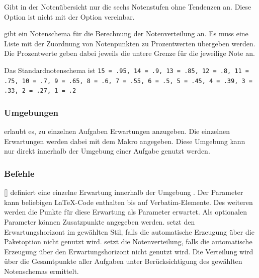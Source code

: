 \begin{options}
     Gibt in der Notenübersicht nur die sechs Notenstufen ohne Tendenzen an. Diese Option ist nicht mit der Option  vereinbar. 

     gibt ein Notenschema für die Berechnung der Notenverteilung an. Es muss eine Liste mit der Zuordnung von Notenpunkten zu Prozentwerten übergeben werden. Die Prozentwerte geben dabei jeweils die untere Grenze für die jeweilige Note an.

    Das Standardnotenschema ist \texttt{15 = .95, 14 = .9, 13 = .85, 12 = .8, 11 = .75, 10 = .7, 9 = .65, 8 = .6, 7 = .55, 6 = .5, 5 = .45, 4 = .39, 3 = .33, 2 = .27, 1 = .2}
\end{options}

\subsubsection{Umgebungen}
\begin{environments}
     erlaubt es, zu einzelnen Aufgaben Erwartungen anzugeben. Die einzelnen Erwartungen werden dabei mit dem Makro  angegeben. Diese Umgebung kann nur direkt innerhalb der Umgebung einer Aufgabe genutzt werden.
\end{environments}

\subsubsection{Befehle}
\begin{commands}
    [] definiert eine einzelne Erwartung innerhalb der Umgebung . Der Parameter kann beliebigen \LaTeX-Code enthalten bis auf Verbatim-Elemente. Des weiteren werden die Punkte für diese Erwartung als Parameter erwartet. Als optionalen Parameter können Zusatzpunkte angegeben werden.
     setzt den Erwartungshorizont im gewählten Stil, falls die automatische Erzeugung über die Paketoption  nicht genutzt wird.
     setzt die Notenverteilung, falls die automatische Erzeugung über den Erwartungshorizont nicht genutzt wird. Die Verteilung wird über die Gesamtpunkte aller Aufgaben unter Berücksichtigung des gewählten Notenschemas ermittelt.
\end{commands}
